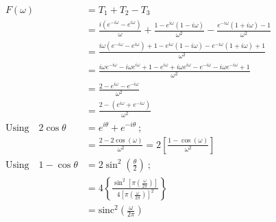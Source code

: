 \documentclass[preview]{standalone}
\begin{document}
\begin{align*}
F(\omega)&=T_{1}+T_{2}-T_{3} \\ &=\frac{i(e^{-i\omega}-e^{i\omega})}{\omega}+\frac{1-e^{i\omega}(1-i\omega)}{\omega^{2}}-\frac{e^{-i\omega}(1+i\omega)-1}{\omega^{2}} \\ &=\frac{i\omega(e^{-i\omega}-e^{i\omega})+1-e^{i\omega}(1-i\omega)-e^{-i\omega}(1+i\omega)+1}{\omega^{2}} \\ &=\frac{i\omega e^{-i\omega}-i\omega e^{i\omega}+1-e^{i\omega}+i\omega e^{i\omega}-e^{-i\omega}-i\omega e^{-i\omega}+1}{\omega^{2}} \\ &=\frac{2-e^{i\omega} - e^{-i\omega}}{\omega^{2}} \\ &=\frac{2-(e^{i\omega}+e^{-i\omega})}{\omega^{2}} \quad \\ \textrm{Using} \quad 2\cos{\theta}&=e^{i\theta}+e^{-i\theta} \ ; \\ &=\frac{2-2\cos{(\omega)}}{\omega^{2}} = 2\left[\frac{1-\cos{(\omega)}}{\omega^{2}}\right] \\ \textrm{Using} \quad 1-\cos{\theta}&=2\sin^{2}{\left( \frac{\theta}{2} \right) } \ ; \\ &=4\left\{ \frac{\sin^{2}{\left[ \pi \left( \frac{\omega}{2\pi} \right) \right]}}{4\left[ \pi \left( \frac{\omega}{2\pi} \right) \right]^{2} } \right\} \\ &=\textrm{sinc}^{2}\left( \frac{\omega}{2\pi} \right)
\end{align*}
\end{document}
